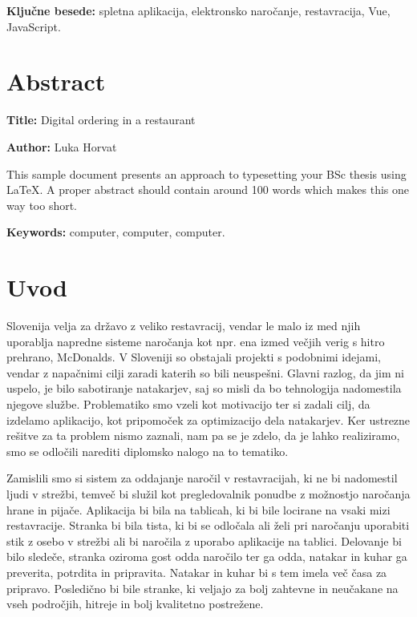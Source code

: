 \documentclass[a4paper, 12pt]{book}
\newcommand{\ttitleEn}{Digital ordering in a restaurant}
\newcommand{\tauthor}{Luka Horvat}
\newcommand{\tkeywords}{spletna aplikacija, elektronsko naročanje, restavracija, Vue, JavaScript}
\newcommand{\tkeywordsEn}{computer, computer, computer}
\newcommand{\clearemptydoublepage}{\newpage{\pagestyle{empty}\cleardoublepage}}
\begin{document}
\noindent\textbf{Ključne besede:} \tkeywords.
\clearemptydoublepage

\chapter*{Abstract}

\noindent\textbf{Title:} \ttitleEn
\bigskip

\noindent\textbf{Author:} \tauthor
\bigskip

\noindent This sample document presents an approach to typesetting your BSc thesis using \LaTeX. 
A proper abstract should contain around 100 words which makes this one way too short.
\bigskip

\noindent\textbf{Keywords:} \tkeywordsEn.
\clearemptydoublepage

\mainmatter
\setcounter{page}{1}
\pagestyle{fancy}
 
\chapter{Uvod}
Slovenija velja za državo z veliko restavracij, vendar le malo iz med njih uporablja napredne sisteme naročanja kot npr. ena izmed večjih verig s hitro prehrano, McDonalds. V Sloveniji so obstajali projekti s podobnimi idejami, vendar z napačnimi cilji zaradi katerih so bili neuspešni. Glavni razlog, da jim ni uspelo, je bilo sabotiranje natakarjev, saj so misli da bo tehnologija nadomestila njegove službe. Problematiko smo vzeli kot motivacijo ter si zadali cilj, da izdelamo aplikacijo, kot pripomoček za optimizacijo dela natakarjev. Ker ustrezne rešitve za ta problem nismo zaznali, nam pa se je zdelo, da je lahko realiziramo, smo se odločili narediti diplomsko nalogo na to tematiko.

Zamislili smo si sistem za oddajanje naročil v restavracijah, ki ne bi nadomestil ljudi v strežbi, temveč bi služil kot pregledovalnik ponudbe z možnostjo naročanja hrane in pijače. Aplikacija bi bila na tablicah, ki bi bile locirane na vsaki mizi restavracije. Stranka bi bila tista, ki bi se odločala ali želi pri naročanju uporabiti stik z osebo v strežbi ali bi naročila z uporabo aplikacije na tablici. Delovanje bi bilo sledeče, stranka oziroma gost odda naročilo ter ga odda, natakar in kuhar ga preverita, potrdita in pripravita.  Natakar in kuhar bi s tem imela več časa za pripravo. Posledično bi bile stranke, ki veljajo za bolj zahtevne in neučakane na vseh področjih, hitreje in bolj kvalitetno postrežene. 
\end{document}
